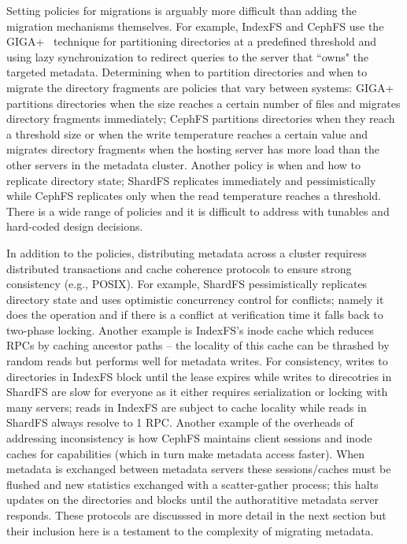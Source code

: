 Setting policies for migrations is arguably more difficult than adding the
migration mechanisms themselves.  For example, IndexFS and CephFS use the
GIGA+~\cite{patil:fast2011-giga} technique for partitioning directories at a predefined
threshold and using lazy synchronization to redirect queries to the server that
``owns" the targeted metadata.  Determining when to partition directories and
when to migrate the directory fragments are policies that vary between systems:
GIGA+ partitions directories when the size reaches a certain number of files
and migrates directory fragments immediately; CephFS partitions directories
when they reach a threshold size or when the write temperature reaches a
certain value and migrates directory fragments when the hosting server has more
load than the other servers in the metadata cluster. Another policy is when and
how to replicate directory state; ShardFS replicates immediately and
pessimistically while CephFS replicates only when the read temperature reaches
a threshold.  There is a wide range of policies and it is difficult to address
with tunables and hard-coded design decisions.

In addition to the policies, distributing metadata across a cluster requiress
distributed transactions and cache coherence protocols to ensure strong
consistency ({e.g.}, POSIX).  For example, ShardFS pessimistically replicates
directory state and uses optimistic concurrency control for conflicts; namely
it does the operation and if there is a conflict at verification time it falls
back to two-phase locking.  Another example is IndexFS's inode cache which
reduces RPCs by caching ancestor paths -- the locality of this cache can be
thrashed by random reads but performs well for metadata writes. For
consistency, writes to directories in IndexFS block until the lease expires
while writes to direcotries in ShardFS are slow for everyone as it either
requires serialization or locking with many servers; reads in IndexFS are
subject to cache locality while reads in ShardFS always resolve to 1 RPC.
Another example of the overheads of addressing inconsistency is how CephFS
maintains client sessions and inode caches for capabilities (which in turn make
metadata access faster). When metadata is exchanged between metadata servers
these sessions/caches must be flushed and new statistics exchanged with a
scatter-gather process; this halts updates on the directories and blocks until
the authoratitive metadata server responds.  These protocols are discusssed in
more detail in the next section but their inclusion here is a testament to the
complexity of migrating metadata.

